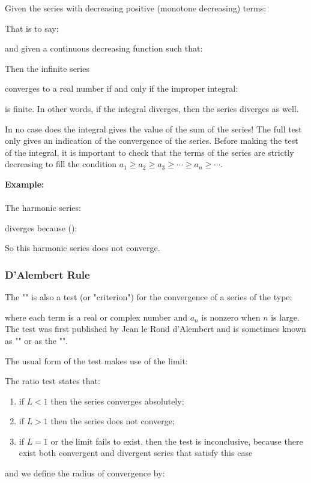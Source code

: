 	Given the series with decreasing positive (monotone decreasing) terms:
	
	That is to say:
	
	and given a continuous decreasing function such that:
	
	Then the infinite series
	
	converges to a real number if and only if the improper integral:
	
	is finite. In other words, if the integral diverges, then the series diverges as well.
	\begin{tcolorbox}[title=Remark,colframe=black,arc=10pt]
	In no case does the integral gives the value of the sum of the series! The full test only gives an indication of the convergence of the series. Before making the test of the integral, it is important to check that the terms of the series are strictly decreasing to fill the condition $a_1\ge a_2\ge a_3\ge \cdots\ge a_n\ge \cdots$.
	\end{tcolorbox}
	\begin{tcolorbox}[colframe=black,colback=white,sharp corners]
	\textbf{{\Large {}}Example:}\\\\
	The harmonic series:
	
	diverges because ():
	
	So this harmonic series does not converge.
	\end{tcolorbox}
	
	\subsubsection{D'Alembert Rule}
	The "" is also a test (or "criterion") for the convergence of a series of the type:
	
	where each term is a real or complex number and $a_n$ is nonzero when $n$ is large. The test was first published by Jean le Rond d'Alembert and is sometimes known as "" or as the "".
	
	The usual form of the test makes use of the limit:
	
 	The ratio test states that:
	\begin{enumerate}
		\item if $L < 1$ then the series converges absolutely;
		\item if $L > 1$ then the series does not converge;
		\item if $L = 1$ or the limit fails to exist, then the test is inconclusive, because there exist both convergent and divergent series that satisfy this case
	\end{enumerate}
	and we define the radius of convergence by:
	
